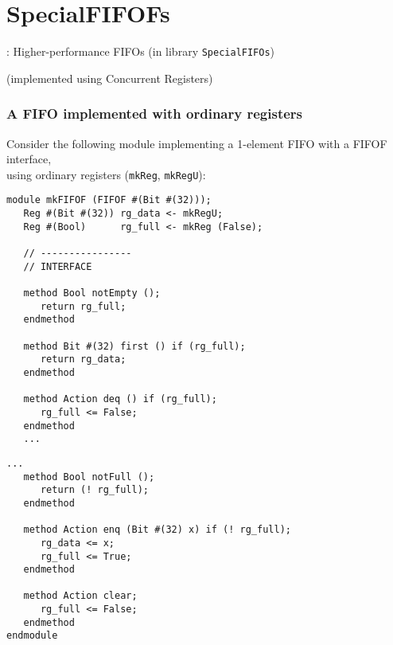 
\section{SpecialFIFOFs}

\begin{frame}

\begin{center}
  {\LARGE {\BSV}: Higher-performance FIFOs (in library {\tt SpecialFIFOs})}

  \vspace{5ex}

  (implemented using Concurrent Registers)
\end{center}

\end{frame}


\begin{frame}[fragile]
\frametitle{A FIFO implemented with ordinary registers}

\footnotesize

Consider the following module implementing a 1-element FIFO with a
FIFOF interface, \\
using ordinary registers ({\tt mkReg}, {\tt mkRegU}):

\vspace{2ex}

\begin{center}
\begin{minipage}[t]{0.45\textwidth}\scriptsize
\begin{Verbatim}[frame=single]
module mkFIFOF (FIFOF #(Bit #(32)));
   Reg #(Bit #(32)) rg_data <- mkRegU;
   Reg #(Bool)      rg_full <- mkReg (False);

   // ----------------
   // INTERFACE

   method Bool notEmpty ();
      return rg_full;
   endmethod

   method Bit #(32) first () if (rg_full);
      return rg_data;
   endmethod

   method Action deq () if (rg_full);
      rg_full <= False;
   endmethod
   ...
\end{Verbatim}
\end{minipage}
\begin{minipage}[t]{0.45\textwidth}\scriptsize
\begin{Verbatim}[frame=single]
   ...
   method Bool notFull ();
      return (! rg_full);
   endmethod

   method Action enq (Bit #(32) x) if (! rg_full);
      rg_data <= x;
      rg_full <= True;
   endmethod

   method Action clear;
      rg_full <= False;
   endmethod
endmodule
\end{Verbatim}
\end{minipage}
\end{center}

\end{frame}

